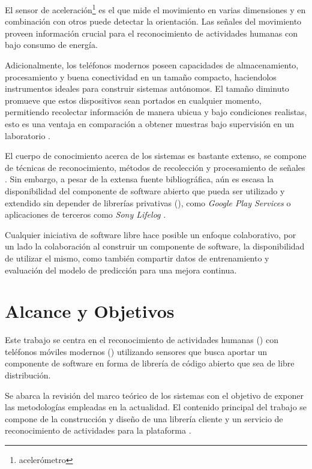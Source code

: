 El sensor de aceleración\footnote{acelerómetro} es el que mide el
movimiento en varias dimensiones y en combinación con otros puede
detectar la orientación. Las señales del movimiento proveen información
crucial para el reconocimiento de actividades humanas con bajo consumo
de energía.

Adicionalmente, los teléfonos modernos poseen capacidades de almacenamiento,
procesamiento y buena conectividad en un tamaño compacto, haciendolos
instrumentos ideales para construir sistemas autónomos. El tamaño
diminuto promueve que estos dispositivos sean portados en cualquier
momento, permitiendo recolectar información de manera ubicua y bajo
condiciones realistas, esto es una ventaja en comparación a obtener
muestras bajo supervisión en un laboratorio \cite{Bao2004}. 

El cuerpo de conocimiento acerca de los sistemas  es bastante
extenso, se compone de técnicas de reconocimiento, métodos de recolección
y procesamiento de señales \cite{LaraLabrador2012,Kwapisz2011}. Sin
embargo, a pesar de la extensa fuente bibliográfica, aún es escasa
la disponibilidad del componente de software abierto que pueda ser
utilizado y extendido sin depender de librerías privativas (),
como \emph{Google Play Services} \cite{Google2016l} o aplicaciones
de terceros como \emph{Sony Lifelog} \cite{Sony2016l}.

Cualquier iniciativa de software libre hace posible un enfoque colaborativo,
por un lado la colaboración al construir un componente de software,
la disponibilidad de utilizar el mismo, como también compartir datos
de entrenamiento y evaluación del modelo de predicción para una mejora
continua.

\section{Alcance y Objetivos}

\label{sec13:alcance-y-objetivos}Este trabajo se centra en el reconocimiento
de actividades humanas () con teléfonos móviles modernos
() utilizando sensores que busca aportar un componente
de software en forma de librería de código abierto que sea de libre
distribución. 

Se abarca la revisión del marco teórico de los sistemas 
con el objetivo de exponer las metodologías empleadas en la actualidad.
El contenido principal del trabajo se compone de la construcción y
diseño de una librería cliente y un servicio de reconocimiento de
actividades para la plataforma \emph{}. 

